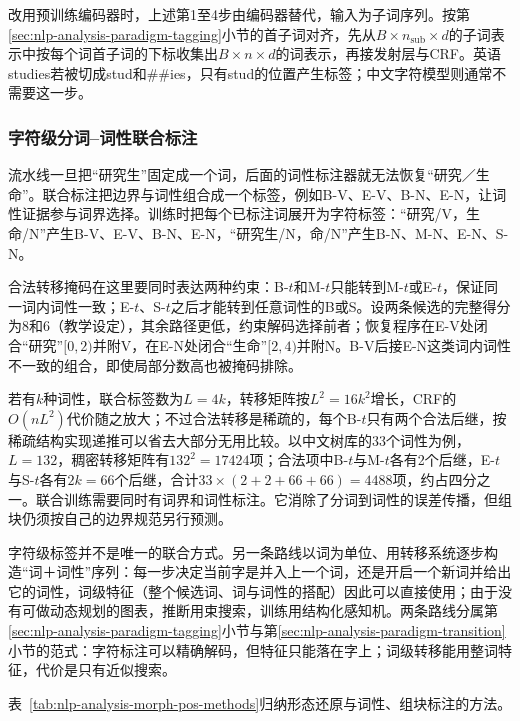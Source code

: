 改用预训练编码器时，上述第1至4步由编码器替代，输入为子词序列。按第\ref{sec:nlp-analysis-paradigm-tagging}小节的首子词对齐，先从$B\times n_{\mathrm{sub}}\times d$的子词表示中按每个词首子词的下标收集出$B\times n\times d$的词表示，再接发射层与CRF。英语studies若被切成stud和\#\#ies，只有stud的位置产生标签；中文字符模型则通常不需要这一步。

\subsubsection{字符级分词--词性联合标注}
\label{sec:nlp-analysis-joint-pos}

流水线一旦把“研究生”固定成一个词，后面的词性标注器就无法恢复“研究／生命”。联合标注把边界与词性组合成一个标签，例如B-V、E-V、B-N、E-N，让词性证据参与词界选择。训练时把每个已标注词展开为字符标签：“研究/V，生命/N”产生B-V、E-V、B-N、E-N，“研究生/N，命/N”产生B-N、M-N、E-N、S-N。

合法转移掩码在这里要同时表达两种约束：B-$t$和M-$t$只能转到M-$t$或E-$t$，保证同一词内词性一致；E-$t$、S-$t$之后才能转到任意词性的B或S。设两条候选的完整得分为8和6（教学设定），其余路径更低，约束解码选择前者；恢复程序在E-V处闭合“研究”$[0,2)$并附V，在E-N处闭合“生命”$[2,4)$并附N。B-V后接E-N这类词内词性不一致的组合，即使局部分数高也被掩码排除。

若有$k$种词性，联合标签数为$L=4k$，转移矩阵按$L^2=16k^2$增长，CRF的$O(nL^2)$代价随之放大；不过合法转移是稀疏的，每个B-$t$只有两个合法后继，按稀疏结构实现递推可以省去大部分无用比较。以中文树库的33个词性为例，$L=132$，稠密转移矩阵有$132^2=17424$项；合法项中B-$t$与M-$t$各有2个后继，E-$t$与S-$t$各有$2k=66$个后继，合计$33\times(2+2+66+66)=4488$项，约占四分之一。联合训练需要同时有词界和词性标注。它消除了分词到词性的误差传播，但组块仍须按自己的边界规范另行预测。

字符级标签并不是唯一的联合方式。另一条路线以词为单位、用转移系统逐步构造“词＋词性”序列：每一步决定当前字是并入上一个词，还是开启一个新词并给出它的词性，词级特征（整个候选词、词与词性的搭配）因此可以直接使用；由于没有可做动态规划的图表，推断用束搜索，训练用结构化感知机。两条路线分属第\ref{sec:nlp-analysis-paradigm-tagging}小节与第\ref{sec:nlp-analysis-paradigm-transition}小节的范式：字符标注可以精确解码，但特征只能落在字上；词级转移能用整词特征，代价是只有近似搜索。

表~\ref{tab:nlp-analysis-morph-pos-methods}归纳形态还原与词性、组块标注的方法。

